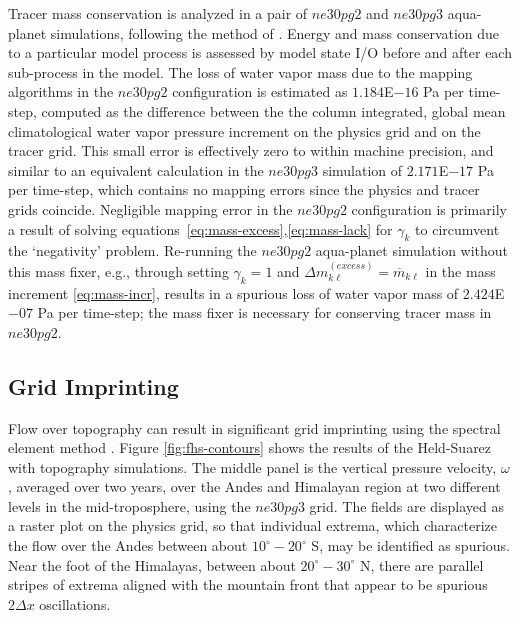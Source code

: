 \documentclass[draft,linenumbers]{agujournal}
\begin{document}
Tracer mass conservation is analyzed in a pair of $ne30pg2$ and $ne30pg3$ aqua-planet simulations, following the method of \cite{LW2019JAMES}. Energy and mass conservation due to a particular model process is assessed by model state I/O before and after each sub-process in the model. The loss of water vapor mass due to the mapping algorithms in the $ne30pg2$ configuration is estimated as $1.184$E$-16$ Pa per time-step, computed as the difference between the the column integrated, global mean climatological water vapor pressure increment on the physics grid and on the tracer grid. This small error is effectively zero to within machine precision, and similar to an equivalent calculation in the $ne30pg3$ simulation of $2.171$E$-17$ Pa per time-step, which contains no mapping errors since the physics and tracer grids coincide. Negligible mapping error in the $ne30pg2$ configuration is primarily a result of solving equations~\eqref{eq:mass-excess},\eqref{eq:mass-lack} for $\gamma_k$ to circumvent the `negativity' problem. Re-running the $ne30pg2$ aqua-planet simulation without this mass fixer, e.g., through setting $\gamma_k=1$ and $\Delta m^{(excess)}_{k\ell} = \overline{m}_{k\ell}$ in the mass increment \eqref{eq:mass-incr}, results in a spurious loss of water vapor mass of $2.424$E$-07$ Pa per time-step; the mass fixer is necessary for conserving tracer mass in $ne30pg2$. 


\subsection{Grid Imprinting}\label{sec:hs94}

Flow over topography can result in significant grid imprinting using the spectral element method \citep[][H18]{gmdd-8-4623-2015}. Figure \ref{fig:fhs-contours} shows the results of the Held-Suarez with topography simulations. The middle panel is the vertical pressure velocity, $\omega$, averaged over two years, over the Andes and Himalayan region at two different levels in the mid-troposphere, using the $ne30pg3$ grid. The fields are displayed as a raster plot on the physics grid, so that individual extrema, which characterize the flow over the Andes between about $10^\circ-20^\circ$ S, may be identified as spurious. Near the foot of the Himalayas, between about $20^\circ-30^\circ$ N, there are parallel stripes of extrema aligned with the mountain front that appear to be spurious $2\Delta x$ oscillations.
\end{document}
